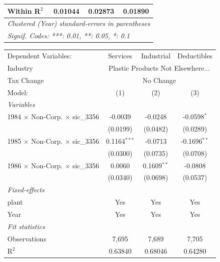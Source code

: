 \documentclass[
  12pt]{article}
\theoremstyle{definition}
\theoremstyle{remark}
\begin{document}
\begin{table}
\begin{minipage}{\linewidth}
\begin{tabular}{lccc}
   Within R$^2$                                  & 0.01044         & 0.02873         & 0.01890\\  
   \midrule \midrule
   \multicolumn{4}{l}{\emph{Clustered (Year) standard-errors in parentheses}}\\
   \multicolumn{4}{l}{\emph{Signif. Codes: ***: 0.01, **: 0.05, *: 0.1}}\\
\end{tabular}
\par\endgroup
\begingroup
\centering
\begin{tabular}{lccc}
   \tabularnewline \midrule \midrule
   Dependent Variables:                          & Services       & Industrial    & Deductibles\\  
   Industry & \multicolumn{3}{c}{Plastic Products Not Elsewhere...} \\ 
   Tax Change & \multicolumn{3}{c}{No Change} \\ 
   Model:                                        & (1)            & (2)           & (3)\\  
   \midrule
   \emph{Variables}\\
   1984 $\times$ Non-Corp. $\times$ sic\_3356    & -0.0039        & -0.0248       & -0.0598$^{*}$\\   
                                                 & (0.0199)       & (0.0482)      & (0.0289)\\   
   1985 $\times$ Non-Corp. $\times$ sic\_3356    & 0.1164$^{***}$ & -0.0713       & -0.1696$^{**}$\\   
                                                 & (0.0300)       & (0.0735)      & (0.0708)\\   
   1986 $\times$ Non-Corp. $\times$ sic\_3356    & 0.0060         & 0.1609$^{**}$ & -0.0808\\   
                                                 & (0.0340)       & (0.0698)      & (0.0537)\\   
   \midrule
   \emph{Fixed-effects}\\
   plant                                         & Yes            & Yes           & Yes\\  
   Year                                          & Yes            & Yes           & Yes\\  
   \midrule
   \emph{Fit statistics}\\
   Observations                                  & 7,695          & 7,689         & 7,705\\  
   R$^2$                                         & 0.63840        & 0.68046       & 0.64280\\  

\end{tabular}
\end{minipage}
\end{table}
\end{document}
